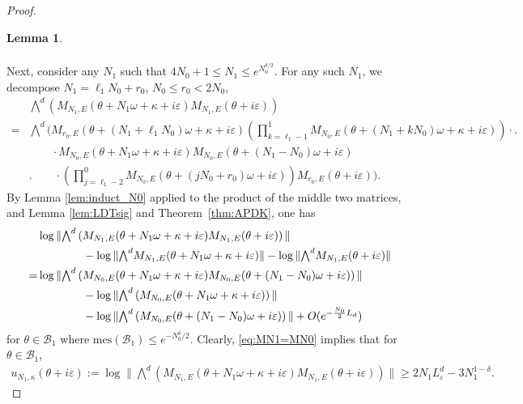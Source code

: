 \documentclass[11pt]{amsart}
\newtheorem{lemma}[theorem]{Lemma}
\begin{document}
\begin{proof}
\begin{lemma}
\begin{align}
\end{align}
\end{lemma}
Next, consider any $N_1$ such that $4N_0+1\leq N_1\leq e^{N_0^{\delta/2}}$.
For any such $N_1$, we decompose $N_1=\ell_1 N_0+r_0$, $N_0\leq r_0<2N_0$,
\begin{align}
    &\textstyle{\bigwedge}^d\left(M_{N_1,E}(\theta+N_1\omega+\kappa+i\varepsilon)M_{N_1,E}(\theta+i\varepsilon)\right)\\
    =&\textstyle{\bigwedge}^d\Big(M_{r_0,E}(\theta+(N_1+\ell_1 N_0)\omega+\kappa+i\varepsilon)(\prod_{k=\ell_1-1}^{1} M_{N_0,E}(\theta+(N_1+kN_0)\omega+\kappa+i\varepsilon))\cdot.\\ 
    &\qquad\cdot M_{N_0,E}(\theta+N_1\omega+\kappa+i\varepsilon)M_{N_0,E}(\theta+(N_1-N_0)\omega+i\varepsilon)\\
    &.\qquad\cdot (\prod_{j=\ell_1-2}^{0} M_{N_0,E}(\theta+(jN_0+r_0)\omega+i\varepsilon))M_{r_0,E}(\theta+i\varepsilon)\Big).
\end{align}
By Lemma \ref{lem:induct_N0} applied to the product of the middle two matrices, and Lemma \ref{lem:LDTsig} and Theorem~\ref{thm:APDK}, one has 
\begin{align}\label{eq:MN1=MN0}
    &\log \|\textstyle{\bigwedge}^d\left(M_{N_1,E}(\theta+N_1\omega+\kappa+i\varepsilon)M_{N_1,E}(\theta+i\varepsilon)\right)\|\\
    &\qquad\qquad-\log \|\textstyle{\bigwedge}^d M_{N_1,E}(\theta+N_1\omega+\kappa+i\varepsilon)\|-\log \|\textstyle{\bigwedge}^d M_{N_1,E}(\theta+i\varepsilon)\|\notag\\
    =&\log \|\textstyle{\bigwedge}^d \left(M_{N_0,E}(\theta+N_1\omega+\kappa+i\varepsilon)M_{N_0,E}(\theta+(N_1-N_0)\omega+i\varepsilon)\right)\|\\
    &\qquad\qquad -\log \|\textstyle{\bigwedge}^d \left(M_{N_0,E}(\theta+N_1\omega+\kappa+i\varepsilon)\right)\|\notag\\
    &\qquad\qquad -\log \|\textstyle{\bigwedge}^d \left(M_{N_0,E}(\theta+(N_1-N_0)\omega+i\varepsilon)\right)\|+O(e^{-\frac{N_0}{2}L_d})
\end{align}
for $\theta\in \mathcal{B}_1$ where $\mathrm{mes}(\mathcal{B}_1)\leq e^{-N_0^{\delta}/2}$. Clearly, \eqref{eq:MN1=MN0} implies that for $\theta\in \mathcal{B}_1$,
\begin{align}\label{eq:LDT_MN1_before}
    u_{N_1,\kappa}(\theta+i\varepsilon):=\log \|\textstyle{\bigwedge}^d \left(M_{N_1,E}(\theta+N_1\omega+\kappa+i\varepsilon)M_{N_1,E}(\theta+i\varepsilon)\right)\|\geq 2N_1L^d_{\varepsilon}-3N_1^{1-\delta}.

\end{align}
\end{proof}
\end{document}
